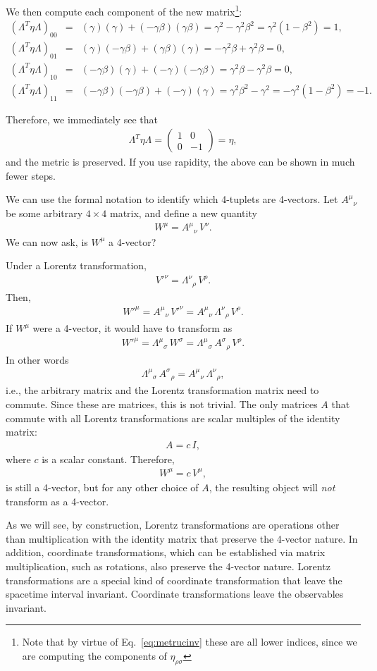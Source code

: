 \documentclass[12pt]{article}
\newcommand{\be}{\begin{eqnarray}}
\newcommand{\ee}{\end{eqnarray}}
\begin{document}
We then compute each component of the new matrix\footnote{Note that by virtue of Eq.~\eqref{eq:metrucinv} these are all lower indices, since we are computing the components of $\eta_{\rho \sigma}$}:
\be
(\Lambda^{T}\eta\Lambda)_{00} &=& (\gamma)(\gamma) + (-\gamma\beta)(\gamma\beta)
= \gamma^2 - \gamma^2\beta^2
= \gamma^2(1 - \beta^2)
= 1, \\[6pt]
(\Lambda^{T}\eta\Lambda)_{01} &=& (\gamma)(-\gamma\beta) + (\gamma\beta)(\gamma)
= -\gamma^2\beta + \gamma^2\beta
= 0, \\[6pt]
(\Lambda^{T}\eta\Lambda)_{10} &= &(-\gamma\beta)(\gamma) + (-\gamma)(-\gamma\beta)
= \gamma^2\beta - \gamma^2\beta
= 0, \\[6pt]
(\Lambda^{T}\eta\Lambda)_{11} &=& (-\gamma\beta)(-\gamma\beta) + (-\gamma)(\gamma)
= \gamma^2\beta^2 - \gamma^2
= -\gamma^2(1 - \beta^2)
= -1.
\ee

Therefore, we immediately see that 
\be
\Lambda^{T}\eta\Lambda =
\begin{pmatrix}
1 & 0 \\[4pt]
0 & -1
\end{pmatrix}
= \eta,
\ee
and the metric is preserved. If you use rapidity, the above can be shown in much fewer steps. 

We can use the formal notation to identify which 4-tuplets are 4-vectors. Let $ A^{\mu}{}_{\nu} $ be some arbitrary $ 4 \times 4 $ matrix, and define a new quantity
\be
W^{\mu} = A^{\mu}{}_{\nu} \, V^{\nu}.
\ee
We can now ask, is $ W^{\mu}$ a 4-vector? 

Under a Lorentz transformation,
\be
V'^{\nu} = \Lambda^{\nu}{}_{\rho} \, V^{\rho}.
\ee
Then,
\be
W'^{\mu} = A^{\mu}{}_{\nu} \, V'^{\nu} 
= A^{\mu}{}_{\nu} \, \Lambda^{\nu}{}_{\rho} \, V^{\rho}.
\ee
If $W^{\mu}$ were a 4-vector, it would have to transform as
\be
W'^{\mu} = \Lambda^{\mu}{}_{\sigma} \, W^{\sigma} 
= \Lambda^{\mu}{}_{\sigma} \, A^{\sigma}{}_{\rho} \, V^{\rho}.
\ee
In other words
\be
\Lambda^{\mu}{}_{\sigma} \, A^{\sigma}{}_{\rho} = A^{\mu}{}_{\nu} \, \Lambda^{\nu}{}_{\rho},
\ee
i.e., the arbitrary matrix and the Lorentz transformation matrix need to commute. Since these are matrices, this is not trivial. The only matrices $A$ that commute with all Lorentz transformations are scalar multiples of the identity matrix:
\be
A = c \, I,
\ee
where $c$ is a scalar constant. Therefore,
\be
W^{\mu} = c \, V^{\mu},
\ee
is still a 4-vector, but for any other choice of $A$, the resulting object will \emph{not} transform as a 4-vector.

As we will see, by construction, Lorentz transformations are operations other than multiplication with the identity matrix that preserve the 4-vector nature. In addition, coordinate transformations, which can be established via matrix multiplication, such as rotations, also preserve the 4-vector nature. Lorentz transformations are a special kind of coordinate transformation that leave the spacetime interval invariant. Coordinate transformations leave the observables invariant.    
\end{document}
